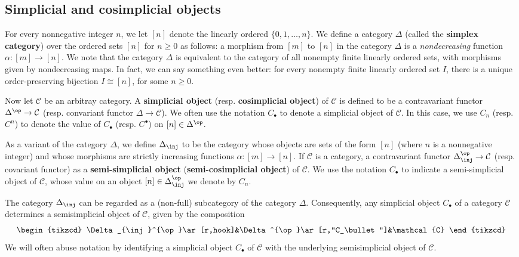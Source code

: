 \subsection{Simplicial and cosimplicial objects}
For every nonnegative integer $n$, we let $[n]$ denote the linearly ordered $\{0,1,\dots,n\}$. We define a category $\Delta$ (called the \textbf{simplex category}) over the ordered sets $[n]$ for $n\geq 0$ as follows: a morphism from $[m]$ to $[n]$ in the category $\Delta$ is a \textit{nondecreasing} function $\alpha:[m]\to[n]$. We note that the category $\Delta$ is equivalent to the category of all nonempty finite linearly ordered sets, with morphisms given by nondecreasing maps. In fact, we can say something even better: for every nonempty finite linearly ordered set $I$, there is a unique order-preserving bijection $I\cong[n]$, for some $n\geq 0$.\par
Now let $\mathcal{C}$ be an arbitray category. A \textbf{simplicial object} (resp. \textbf{cosimplicial object}) of $\mathcal{C}$ is defined to be a contravariant functor $\Delta^{\op}\to\mathcal{C}$ (resp. convariant functor $\Delta\to\mathcal{C}$). We often use the notation $C_\bullet$ to denote a simplicial object of $\mathcal{C}$. In this case, we use $C_n$ (resp. $C^n$) to denote the value of $C_\bullet$ (resp. $C^\bullet$) on $[n]\in\Delta^{\op}$.\par
As a variant of the category $\Delta$, we define $\Delta_{\inj}$ to be the category whose objects are sets of the form $[n]$ (where $n$ is a nonnegative integer) and whose morphisms are strictly increasing functions $\alpha:[m]\to[n]$. If $\mathcal{C}$ is a category, a contravariant functor $\Delta_{\inj}^{\op}\to\mathcal{C}$ (resp. covariant functor) as a \textbf{semi-simplicial object} (\textbf{semi-cosimplicial object}) of $\mathcal{C}$. We use the notation $C_\bullet$ to indicate a semi-simplicial object of $\mathcal{C}$, whose value on an object $[n]\in\Delta^{\op}_{\inj}$ we denote by $C_n$.
\begin{remark}
The category $\Delta_{\inj}$ can be regarded as a (non-full) subcategory of the category $\Delta$. Consequently, any simplicial object $C_\bullet$ of a category $\mathcal{C}$ determines a semisimplicial object of $\mathcal{C}$, given by the composition
\[\begin{tikzcd}
\Delta_{\inj}^{\op}\ar[r,hook]&\Delta^{\op}\ar[r,"C_\bullet"]&\mathcal{C}
\end{tikzcd}
\]
We will often abuse notation by identifying a simplicial object $C_\bullet$ of $\mathcal{C}$ with the underlying semisimplicial object of $\mathcal{C}$.
\end{remark}
